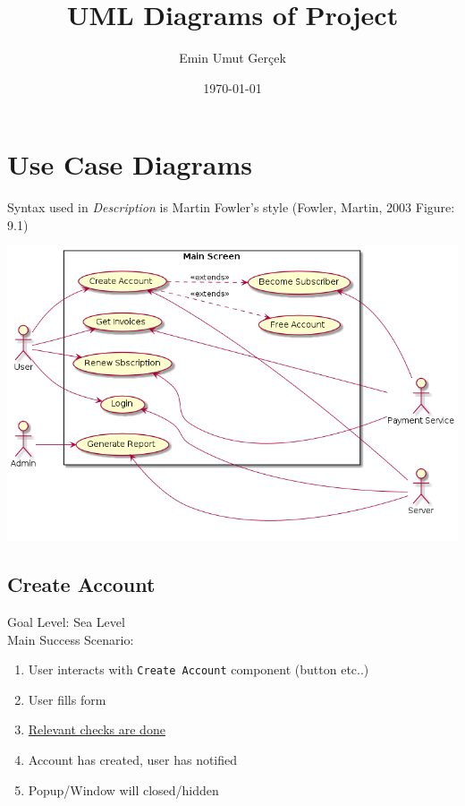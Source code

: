 \documentclass[11pt]{article}
\author{Emin Umut Gerçek}
\date{\today}
\title{UML Diagrams of Project}
\begin{document}
\maketitle
\tableofcontents

\setlength{\parindent}{0cm}


\pagebreak

\section{Use Case Diagrams}
\label{sec:orge9ba227}
Syntax used in \emph{Description} is Martin Fowler's style (Fowler, Martin, 2003 Figure: 9.1)

\begin{center}
\includegraphics[width=.9\linewidth]{UseCase.png}
\end{center}


\subsection{Create Account}
\label{sec:org67296b5}
Goal Level: Sea Level \\
Main Success Scenario: \\

\begin{enumerate}
\item User interacts with \texttt{Create Account} component (button etc..)
\item User fills form
\item \uline{Relevant checks are done}
\item Account has created, user has notified
\item Popup/Window will closed/hidden
\end{enumerate}
\end{document}
